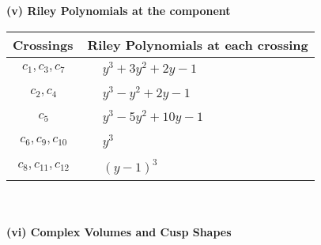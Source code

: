 \documentclass[1p]{elsarticle_modified}
\theoremstyle{definition}
\begin{document}
\newpage\renewcommand{\arraystretch}{1}
\flushleft \textbf{(v) Riley Polynomials at the component}\newline \\
\begin{tabular}{m{50pt}|m{274pt}}
Crossings & \hspace{64pt}Riley Polynomials at each crossing \\
\hline $$\begin{aligned}c_{1},c_{3},c_{7}\end{aligned}$$&$\begin{aligned}
&y^3+3 y^2+2 y-1
\end{aligned}$\\
\hline $$\begin{aligned}c_{2},c_{4}\end{aligned}$$&$\begin{aligned}
&y^3- y^2+2 y-1
\end{aligned}$\\
\hline $$\begin{aligned}c_{5}\end{aligned}$$&$\begin{aligned}
&y^3-5 y^2+10 y-1
\end{aligned}$\\
\hline $$\begin{aligned}c_{6},c_{9},c_{10}\end{aligned}$$&$\begin{aligned}
&y^3
\end{aligned}$\\
\hline $$\begin{aligned}c_{8},c_{11},c_{12}\end{aligned}$$&$\begin{aligned}
&(y-1)^3
\end{aligned}$\\
\hline
\end{tabular}\\~\\
\newpage\flushleft \textbf{(vi) Complex Volumes and Cusp Shapes}
\end{document}
